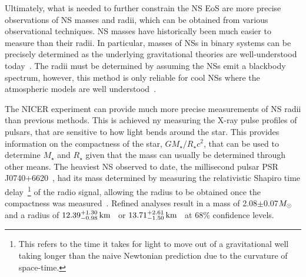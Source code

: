 Ultimately, what is needed to further constrain the NS EoS are more precise observations of NS masses and radii, which can be obtained from various observational techniques. NS masses have historically been much easier to measure than their radii. In particular, masses of NSs in binary systems can be precisely determined as the underlying gravitational theories are well-understood today~\cite{Steiner:2010fz_EquationStateObserved, Steiner:2010fz_EquationStateObserved, Lattimer:2013hma_mar_NeutronStarMasses, Ozel:2015fia_mar_DenseMatterEquation,Ozel:2016oaf_jul_MassesRadiiEquation, Miller:2016pom_mar_ObservationalConstraintsNeutron}. The radii must be determined by assuming the NSs emit a blackbody spectrum, however, this method is only reliable for cool NSs where the atmospheric models are well understood~\cite{Miller:2016pom_mar_ObservationalConstraintsNeutron}. 

The NICER experiment can provide much more precise measurements of NS radii than previous methods. This is achieved ny measuring the X-ray pulse profiles of pulsars, that are sensitive to how light bends around the star. This provides information on the compactness of the star, $G M_\star/R_\star c^2$, that can be used to determine $M_\star$ and $R_\star$ given that the mass can usually be determined through other means. The heaviest NS observed to date, the millisecond pulsar PSR J0740+6620~\cite{Miller:2021qha_sep_RadiusPSRJ0740, Riley:2021pdl_sep_NICERViewMassive}, had its mass determined by measuring the relativistic Shapiro time delay~\cite{Shapiro:1964uw_FourthTestGeneral}\footnote{This refers to the time it takes for light to move out of a gravitational well taking longer than the naive Newtonian prediction due to the curvature of space-time.} of the radio signal, allowing the radius to be obtained once the compactness was measured~\cite{NANOGrav:2019jur_sep_RelativisticShapirodelay}. Refined analyses result in a mass of 2.08$\pm$0.07$M_\odot$~\cite{Fonseca:2021wxt_jul_RefinedMassGeometric} and a radius of $12.39^{+1.30}_{-0.98} {\rm \,km}$~\cite{Riley:2021pdl_sep_NICERViewMassive} or $13.71^{+2.61}_{-1.50} {\rm \,km}$~\cite{Miller:2021qha_sep_RadiusPSRJ0740} at 68\% confidence levels. 


